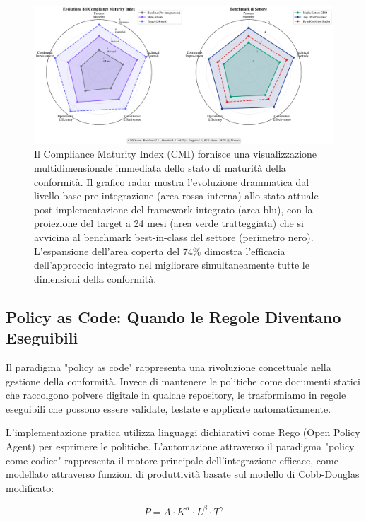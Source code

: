\begin{figure}[htbp]
\centering
\includegraphics[width=\textwidth]{thesis_figures/cap4/figura_4_2_cmi_radar.pdf}
\caption{Il Compliance Maturity Index (CMI) fornisce una visualizzazione multidimensionale immediata dello stato di maturità della conformità. Il grafico radar mostra l'evoluzione drammatica dal livello base pre-integrazione (area rossa interna) allo stato attuale post-implementazione del framework integrato (area blu), con la proiezione del target a 24 mesi (area verde tratteggiata) che si avvicina al benchmark best-in-class del settore (perimetro nero). L'espansione dell'area coperta del 74\% dimostra l'efficacia dell'approccio integrato nel migliorare simultaneamente tutte le dimensioni della conformità.}
\label{fig:cmi_radar}
\end{figure}

\subsection{Policy as Code: Quando le Regole Diventano Eseguibili}

Il paradigma "policy as code" rappresenta una rivoluzione concettuale nella gestione della conformità. Invece di mantenere le politiche come documenti statici che raccolgono polvere digitale in qualche repository, le trasformiamo in regole eseguibili che possono essere validate, testate e applicate automaticamente.

L'implementazione pratica utilizza linguaggi dichiarativi come Rego (Open Policy Agent) per esprimere le politiche. L'automazione attraverso il paradigma "policy come codice" rappresenta il motore principale dell'integrazione efficace, come modellato attraverso funzioni di produttività basate sul modello di Cobb-Douglas modificato\autocite{Brynjolfsson2016}:

\begin{equation}
P = A \cdot K^{\alpha} \cdot L^{\beta} \cdot T^{\gamma}
\end{equation}

